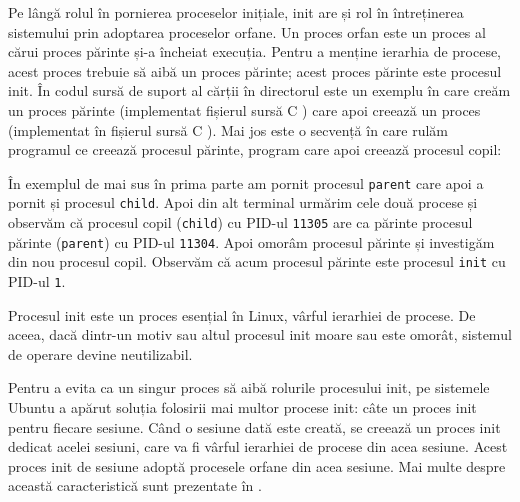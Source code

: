Pe lângă rolul în pornierea proceselor inițiale, init are și rol în întreținerea
sistemului prin adoptarea proceselor orfane. Un proces orfan este un proces al
cărui proces părinte și-a încheiat execuția. Pentru a menține ierarhia de
procese, acest proces trebuie să aibă un proces părinte; acest proces părinte
este procesul init. În codul sursă de suport al cărții în directorul  este un exemplu în care creăm un proces părinte (implementat fișierul sursă C ) care apoi creează un proces (implementat în fișierul sursă C ). Mai jos este o secvență în care rulăm programul ce creează procesul părinte, program care apoi creează procesul copil:

În exemplul de mai sus în prima parte am pornit procesul \texttt{parent} care apoi a pornit și procesul \texttt{child}. Apoi din alt terminal urmărim cele două procese și observăm că procesul copil (\texttt{child}) cu PID-ul \texttt{11305} are ca părinte procesul părinte (\texttt{parent}) cu PID-ul \texttt{11304}. Apoi omorâm procesul părinte și investigăm din nou procesul copil. Observăm că acum procesul părinte este procesul \texttt{init} cu PID-ul \texttt{1}.

Procesul init este un proces esențial în Linux, vârful ierarhiei de procese. De
aceea, dacă dintr-un motiv sau altul procesul init moare sau este omorât,
sistemul de operare devine neutilizabil.

Pentru a evita ca un singur proces să aibă rolurile procesului init, pe
sistemele Ubuntu a apărut soluția folosirii mai multor procese init: câte un
proces init pentru fiecare sesiune. Când o sesiune dată este creată, se creează
un proces init dedicat acelei sesiuni, care va fi vârful ierarhiei de procese
din acea sesiune. Acest proces init de sesiune adoptă procesele orfane din acea
sesiune. Mai multe despre această caracteristică sunt prezentate în .


